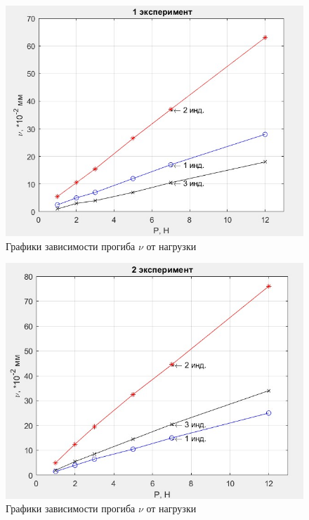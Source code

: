 \documentclass[12pt, a4paper]{article}
\begin{document}
 
\begin{figure}[h]
\centering
\includegraphics[width = 15cm]{nu_1.jpg}
\caption{Графики зависимости прогиба $\nu$ от нагрузки}
\label{nu_levoe}
\end{figure}

\begin{figure}[h]
\centering
\includegraphics[width = 15cm]{nu_2.jpg}
\caption{Графики зависимости прогиба $\nu$ от нагрузки}
\label{nu_pravoe}
\end{figure}
\end{document}
